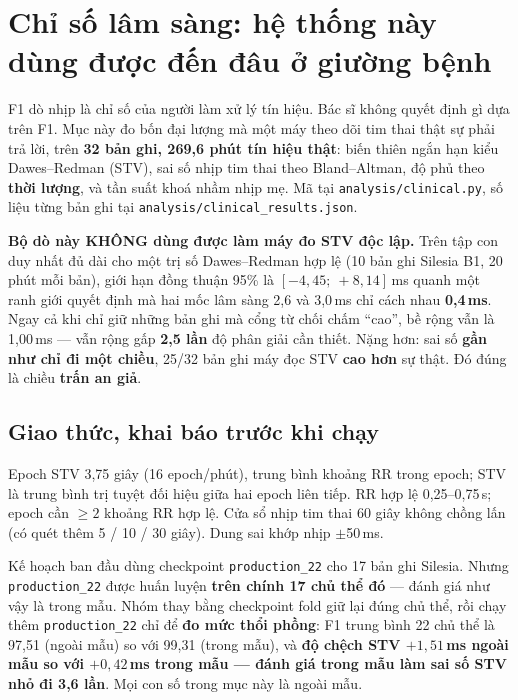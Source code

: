 \section{Chỉ số lâm sàng: hệ thống này dùng được đến đâu ở giường bệnh}
\label{sec:clinical}

F1 dò nhịp là chỉ số của người làm xử lý tín hiệu. Bác sĩ không quyết định gì dựa trên F1. Mục này đo
bốn đại lượng mà một máy theo dõi tim thai thật sự phải trả lời, trên \textbf{32 bản ghi, 269,6 phút tín
hiệu thật}: biến thiên ngắn hạn kiểu Dawes--Redman (STV), sai số nhịp tim thai theo Bland--Altman, độ phủ
theo \textbf{thời lượng}, và tần suất khoá nhầm nhịp mẹ. Mã tại \texttt{analysis/clinical.py}, số liệu
từng bản ghi tại \texttt{analysis/clinical\_results.json}.

\begin{canhbao}[title={Kết luận đặt ngay đầu mục, trước mọi con số}]
\textbf{Bộ dò này KHÔNG dùng được làm máy đo STV độc lập.} Trên tập con duy nhất đủ dài cho một trị số
Dawes--Redman hợp lệ (10 bản ghi Silesia B1, 20 phút mỗi bản), giới hạn đồng thuận 95\% là
$[-4{,}45;\ +8{,}14]$\,ms quanh một ranh giới quyết định mà hai mốc lâm sàng 2,6 và 3,0\,ms chỉ cách nhau
\textbf{0,4\,ms}. Ngay cả khi chỉ giữ những bản ghi mà cổng từ chối chấm ``cao'', bề rộng vẫn là 1,00\,ms
--- vẫn rộng gấp \textbf{2,5 lần} độ phân giải cần thiết. Nặng hơn: sai số \textbf{gần như chỉ đi một
chiều}, 25/32 bản ghi máy đọc STV \textbf{cao hơn} sự thật. Đó đúng là chiều \textbf{trấn an giả}.
\end{canhbao}

\subsection{Giao thức, khai báo trước khi chạy}

Epoch STV 3,75 giây (16 epoch/phút), trung bình khoảng RR trong epoch; STV là trung bình trị tuyệt đối
hiệu giữa hai epoch liên tiếp. RR hợp lệ 0,25--0,75\,s; epoch cần $\geq 2$ khoảng RR hợp lệ. Cửa sổ nhịp
tim thai 60 giây không chồng lấn (có quét thêm 5 / 10 / 30 giây). Dung sai khớp nhịp $\pm$50\,ms.

\begin{ghichu}[title={Một sai lệch có chủ ý so với kế hoạch, và lý do}]
Kế hoạch ban đầu dùng checkpoint \texttt{production\_22} cho 17 bản ghi Silesia. Nhưng
\texttt{production\_22} được huấn luyện \textbf{trên chính 17 chủ thể đó} --- đánh giá như vậy là trong
mẫu. Nhóm thay bằng checkpoint fold giữ lại đúng chủ thể, rồi chạy thêm \texttt{production\_22} chỉ để
\textbf{đo mức thổi phồng}: F1 trung bình 22 chủ thể là 97,51 (ngoài mẫu) so với 99,31 (trong mẫu), và
\textbf{độ chệch STV $+1{,}51$\,ms ngoài mẫu so với $+0{,}42$\,ms trong mẫu --- đánh giá trong mẫu làm
sai số STV nhỏ đi 3,6 lần}. Mọi con số trong mục này là ngoài mẫu.
\end{ghichu}

